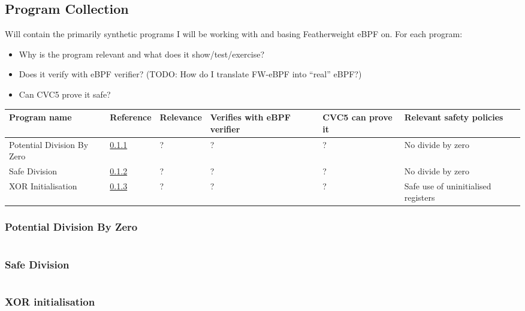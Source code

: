 \subsection{Program Collection}
\label{subsec:program_collection}

Will contain the primarily synthetic programs I will be working with and basing Featherweight eBPF on.
\newline
For each program:
\begin{itemize}
    \item Why is the program relevant and what does it show/test/exercise?  
    \item Does it verify with eBPF verifier?  (TODO: How do I translate FW-eBPF into ``real'' eBPF?)
    \item Can CVC5 prove it safe?
\end{itemize}

\begin{table}[h]
\begin{tabularx}{\textwidth}{|X|X|X|X|X|X|} \hline
  \textbf{Program name} & \textbf{Reference} & \textbf{Relevance} & \textbf{Verifies with eBPF verifier} & \textbf{CVC5 can prove it} & \textbf{Relevant safety policies} \\ \hline
  Potential Division By Zero & \ref{subsubsec:bad_div} & ? & ? & ? & No divide by zero \\ \hline
  Safe Division & \ref{subsubsec:good_div} & ? & ? & ? & No divide by zero \\ \hline
  XOR Initialisation & \ref{subsubsec:xor_init} & ? & ? & ? & Safe use of uninitialised registers  \\ \hline   
\end{tabularx}
\end{table}

\subsubsection{Potential Division By Zero}
\label{subsubsec:bad_div}

\inputminted{text}{programs/bad_div.ebpf}


\subsubsection{Safe Division}
\label{subsubsec:good_div}

\inputminted{text}{programs/good_div.ebpf}


\subsubsection{XOR initialisation}
\label{subsubsec:xor_init}

\inputminted{text}{programs/xor_init.ebpf}


